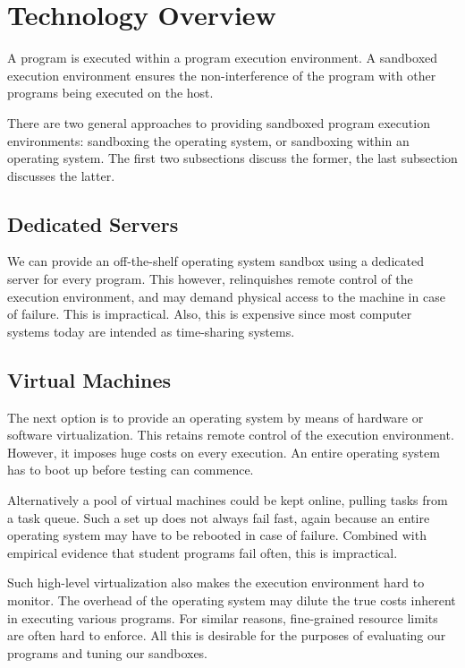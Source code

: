 
\section{Technology Overview}

A program is executed within a program execution environment. A sandboxed
execution environment ensures the non-interference of the program with other
programs being executed on the host.

There are two general approaches to providing sandboxed program execution
environments: sandboxing the operating system, or sandboxing within an
operating system. The first two subsections discuss the former, the last
subsection discusses the latter.

\subsection{Dedicated Servers}

We can provide an off-the-shelf operating system sandbox using a dedicated
server for every program. This however, relinquishes remote control of the
execution environment, and may demand physical access to the machine in case of
failure. This is impractical. Also, this is expensive since most computer
systems today are intended as time-sharing systems.

\subsection{Virtual Machines}

The next option is to provide an operating system by means of hardware or
software virtualization. This retains remote control of the execution
environment. However, it imposes huge costs on every execution. An entire
operating system has to boot up before testing can commence.

Alternatively a pool of virtual machines could be kept online, pulling tasks
from a task queue. Such a set up does not always fail fast, again because an
entire operating system may have to be rebooted in case of failure. Combined
with empirical evidence that student programs fail often, this is impractical.

Such high-level virtualization also makes the execution environment hard to
monitor. The overhead of the operating system may dilute the true costs
inherent in executing various programs. For similar reasons, fine-grained
resource limits are often hard to enforce. All this is desirable for the
purposes of evaluating our programs and tuning our sandboxes.

